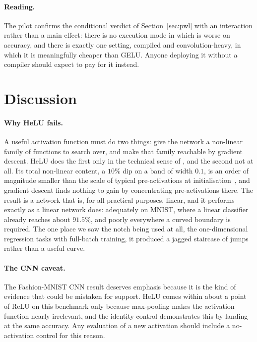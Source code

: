 \documentclass[11pt]{article}
\begin{document}
{\paragraph{Reading.} The pilot confirms the conditional verdict of Section~\ref{sec:pwl} with an
interaction rather than a main effect: there is no execution mode in which \pwlBest{} is worse on
accuracy, and there is exactly one setting, compiled and convolution-heavy, in which it is meaningfully
cheaper than GELU. Anyone deploying it without a compiler should expect to pay for it instead.
}{}

\section{Discussion}

\paragraph{Why HeLU fails.} A useful activation function must do two things: give the network a
non-linear family of functions to search over, and make that family reachable by gradient descent.
HeLU does the first only in the technical sense of \citet{leshno1993multilayer}, and the second not at
all. Its total non-linear content, a $10\%$ dip on a band of width $0.1$, is an order of magnitude
smaller than the scale of typical pre-activations at initialisation~\citep{he2015delving}, and gradient
descent finds nothing to gain by concentrating pre-activations there. The result is a network that is,
for all practical purposes, linear, and it performs exactly as a linear network does: adequately on
MNIST, where a linear classifier already reaches about $91.5\%$, and poorly everywhere a curved
boundary is required. The one place we saw the notch being used at all, the one-dimensional regression
tasks with full-batch training, it produced a jagged staircase of jumps rather than a useful curve.

\paragraph{The CNN caveat.} The Fashion-MNIST CNN result deserves emphasis because it is the kind of
evidence that could be mistaken for support. HeLU comes within about a point of ReLU on this benchmark
only because max-pooling makes the activation function nearly irrelevant, and the identity control
demonstrates this by landing at the same accuracy. Any evaluation of a new activation should include a
no-activation control for this reason.
\end{document}
